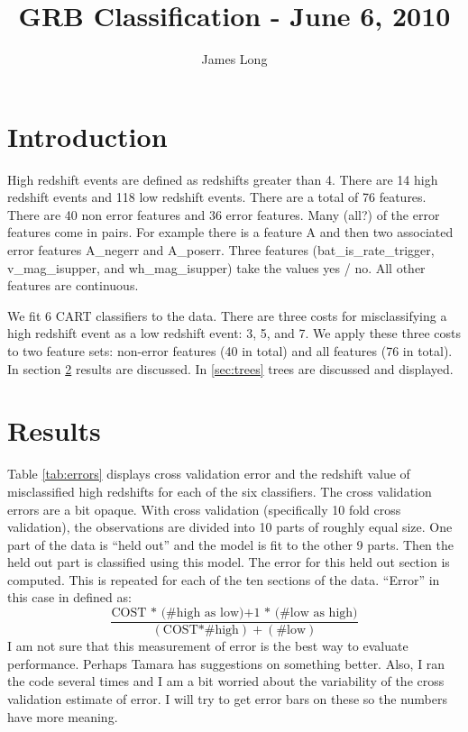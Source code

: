 \documentclass[10pt]{article}
\title{GRB Classification - June 6, 2010}
\date{}
\author{James Long}
\begin{document}
\maketitle
\section{Introduction}

High redshift events are defined as redshifts greater than 4. There are 14 high redshift events and 118 low redshift events. There are a total of 76 features. There are 40 non error features and 36 error features. Many (all?) of the error features come in pairs. For example there is a feature A and then two associated error features A\_negerr and A\_poserr. Three features (bat\_is\_rate\_trigger, v\_mag\_isupper, and wh\_mag\_isupper) take the values yes / no. All other features are continuous.

We fit 6 CART classifiers to the data. There are three costs for misclassifying a high redshift event as a low redshift event: 3, 5, and 7. We apply these three costs to two feature sets: non-error features (40 in total) and all features (76 in total). In section \ref{sec:results} results are discussed. In \ref{sec:trees} trees are discussed and displayed.

\section{Results}
\label{sec:results}

Table \ref{tab:errors} displays cross validation error and the redshift value of misclassified high redshifts for each of the six classifiers. The cross validation errors are a bit opaque. With cross validation (specifically 10 fold cross validation), the observations are divided into 10 parts of roughly equal size. One part of the data is ``held out'' and the model is fit to the other 9 parts. Then the held out part is classified using this model. The error for this held out section is computed. This is repeated for each of the ten sections of the data. ``Error'' in this case in defined as:
\begin{equation}
\frac{\text{COST * (\# high as low)} + \text{1 * (\# low as high)}}{(\text{COST*\# high}) + (\text{\# low})} 
\end{equation}
I am not sure that this measurement of error is the best way to evaluate performance. Perhaps Tamara has suggestions on something better. Also, I ran the code several times and I am a bit worried about the variability of the cross validation estimate of error. I will try to get error bars on these so the numbers have more meaning.
\end{document}
